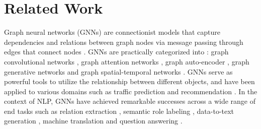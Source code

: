 \documentclass[11pt,a4paper]{article}
\begin{document}
\section{Related Work}
\begin{comment}
\paragraph{Transductive Learning}~{}\newline
Transductive learning \citep{Vapnik1998} differs from inductive learning in terms of that transductive learning makes use of unlabeled test examples in the training process. Early literature for transductive text classification usually uses feature based models such as SVMs \citep{joachims1999transductive,bruzzone2006novel}, SVD \citep{sarah2004} and $k$NNs \citep{joachims2003transductive} to incorporate the unlabeled test set as additional source information during training.
Particularly, graph-based methods have exhibited their effectiveness in transductive learning.
Label propagation \citep{zhu2003semi} and PageRank \citep{page1999pagerank} respectively models the entire graph by passing label information and feature information through edges between nodes in graphs. In this way, even unlabeled test examples can benefit from label and feature propagation.
DeepWalk \citep{10.1145/2623330.2623732} applied neural embeddings to model graphs. It learns graph embeddings by predicting local nodes in the neighborhood sampled from random walks on the graph.
\citet{weston2012deep,yang2016revisiting} extended the idea of graph embeddings to semi-supervised learning by either using a regularizer to the graph structure or predicting the graph context.
\end{comment}

Graph neural networks (GNNs) are connectionist models that capture dependencies and relations between graph nodes via message passing through edges that connect nodes \citep{scarselli2008graph,hamilton2017inductive,xu2018powerful}. GNNs are practically categorized into \citep{wu2020comprehensive}: graph convolutional networks \citep{kipf2016semi,wu2019simplifying}, graph attention networks \citep{velivckovic2017graph,zhang2018gaan}, graph auto-encoder \citep{cao2016deep,kipf2016variational}, graph generative networks \citep{de2018molgan,li2018learning} and graph spatial-temporal networks \citep{li2017diffusion,yu2017spatio}. 
GNNs serve as powerful tools to utilize the relationship between different objects, and have been applied to various domains such as traffic prediction \citep{yu2018spatio,zhang2018gaan} and recommendation \citep{zhang2020comprehensive,monti2017geometric}.
In the context of NLP, GNNs have achieved remarkable successes across a wide range of end tasks such as relation extraction \citep{zhang2018graph}, semantic role labeling \citep{marcheggiani-titov-2017-encoding}, data-to-text generation \citep{marcheggiani-perez-beltrachini-2018-deep}, machine translation \citep{bastings-etal-2017-graph} and question answering \citep{song2018exploring,de2018question}.
\end{document}
